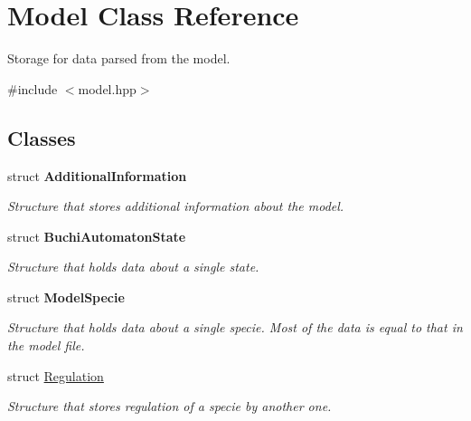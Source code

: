 \hypertarget{classModel}{\section{\-Model \-Class \-Reference}
\label{classModel}
}


\-Storage for data parsed from the model.  




{\ttfamily \#include $<$model.\-hpp$>$}

\subsection*{\-Classes}
\begin{DoxyCompactItemize}
\item 
struct {\bfseries \-Additional\-Information}
\begin{DoxyCompactList}\small\item\em \-Structure that stores additional information about the model. \end{DoxyCompactList}\item 
struct {\bfseries \-Buchi\-Automaton\-State}
\begin{DoxyCompactList}\small\item\em \-Structure that holds data about a single state. \end{DoxyCompactList}\item 
struct {\bfseries \-Model\-Specie}
\begin{DoxyCompactList}\small\item\em \-Structure that holds data about a single specie. \-Most of the data is equal to that in the model file. \end{DoxyCompactList}\item 
struct \hyperlink{structModel_1_1Regulation}{\-Regulation}
\begin{DoxyCompactList}\small\item\em \-Structure that stores regulation of a specie by another one. \end{DoxyCompactList}\end{DoxyCompactItemize}
